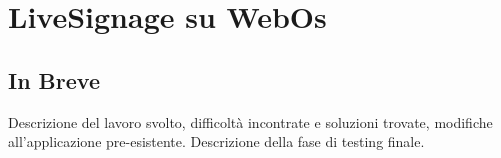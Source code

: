 \chapter{LiveSignage su WebOs}

\section{In Breve}
Descrizione del lavoro svolto, difficoltà incontrate e soluzioni trovate, modifiche all'applicazione pre-esistente. Descrizione della fase di testing finale.